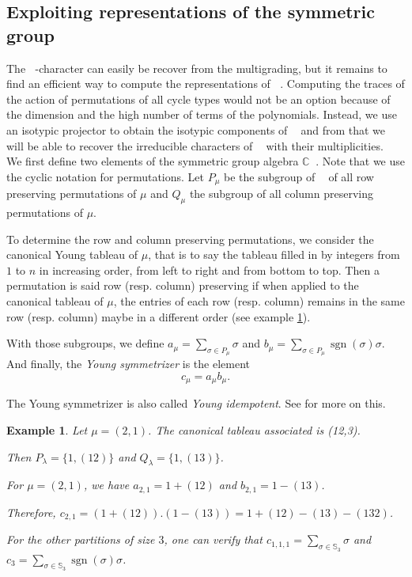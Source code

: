 \documentclass[letter,12pt]{article}
\newcommand{\CC}{\mathbb{C}}
\newcommand{\Sym}[1]{\mathbb{S}_{#1}}
\DeclareMathOperator{\Sn}{\mathbb{S}_n}
\DeclareMathOperator{\GLr}{GL_r}
\DeclareMathOperator{\sgn}{sgn}
\newtheorem{example}{Example}
\newcommand{\tableau}{\YFrench \Yboxdim{10pt}\young}
\begin{document}
	\subsection{Exploiting representations of the symmetric group}
	
	The $\GLr$-character can easily be recover from the multigrading, but it remains to find an efficient way to compute the representations of $\Sn$. Computing the traces of the action of permutations of all cycle types would not be an option because of the dimension and the high number of terms of the polynomials. 
	Instead, we use an isotypic projector to obtain the isotypic components of $\Sn$ and from that we will be able to recover the irreducible characters of $\Sn$ with their multiplicities. \\
	
	We first define two elements of the symmetric group algebra $\CC \Sn$. Note that we use the cyclic notation for permutations.
	Let $P_{\mu}$ be the subgroup of $\Sn$ of all row preserving permutations of $\mu$ and $Q_{\mu}$ the subgroup of all column preserving permutations of $\mu$. 
	
	To determine the row and column preserving permutations, we consider the canonical Young tableau of $\mu$, that is to say the tableau filled in by integers from $1$ to $n$ in increasing order, from left to right and from bottom to top. Then a permutation is said row (resp. column) preserving if when applied to the canonical tableau of $\mu$, the entries of each row (resp. column) remains in the same row (resp. column) maybe in a different order (see example \ref{young_idempotent}).  
	
	With those subgroups, we define $a_{\mu} = \sum_{\sigma \in P_{\mu}} \sigma$ and  $b_{\mu} = \sum_{\sigma \in P_{\mu}} \sgn(\sigma) \sigma$. And finally, the \emph{Young symmetrizer} is the element $$c_{\mu} = a_{\mu} b_{\mu}.$$
	
	The Young symmetrizer is also called \emph{Young idempotent}. See \cite{FultonHarris1991} for more on this. 
	
	\begin{example}\label{young_idempotent} Let $\mu = (2,1)$.
		The canonical tableau associated is \tableau(12,3).
		
		Then $P_\lambda = \{1, (12)\}$ and $Q_\lambda = \{1, (13)\}$. 
		 
		For $\mu=(2,1)$, we have
		$a_{2,1} = 1 + (12)$ and
		$b_{2,1} = 1 - (13)$. 
		
		Therefore, $c_{2,1} = (1 + (12)) . (1 - (13)) = 1 + (12) - (13) - (132)$. 
		
		For the other partitions of size $3$, one can verify that 
		$c_{1,1,1} = \sum_{\sigma \in \Sym{3}} \sigma$ and 
		$c_{3} = \sum_{\sigma \in \Sym{3}} \sgn(\sigma)\sigma$.
	\end{example}
	
\end{document}
